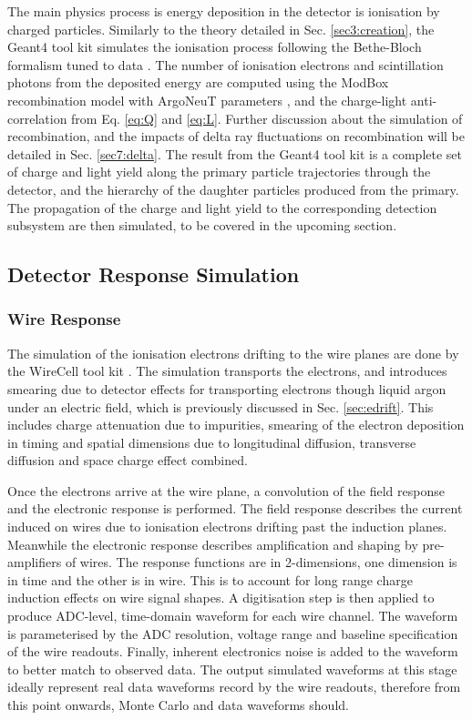 The main physics process is energy deposition in the detector is ionisation by charged particles.
Similarly to the theory detailed in Sec. \ref{sec3:creation}, the Geant4 tool kit simulates the ionisation process following the Bethe-Bloch formalism tuned to data \cite{geant4_ions}.
The number of ionisation electrons and scintillation photons from the deposited energy are computed using the ModBox recombination model with ArgoNeuT parameters \cite{argoneut_recomb}, and the charge-light anti-correlation from Eq. \ref{eq:Q} and \ref{eq:L}. 
Further discussion about the simulation of recombination, and the impacts of delta ray fluctuations on recombination will be detailed in Sec. \ref{sec7:delta}.
The result from the Geant4 tool kit is a complete set of charge and light yield along the primary particle trajectories through the detector, and the hierarchy of the daughter particles produced from the primary.
The propagation of the charge and light yield to the corresponding detection subsystem are then simulated, to be covered in the upcoming section.

\subsection{Detector Response Simulation}
\label{sec:gen_response}

\subsubsection{Wire Response}

The simulation of the ionisation electrons drifting to the wire planes are done by the WireCell tool kit \cite{wirecell}.
The simulation transports the electrons, and introduces smearing due to detector effects for transporting electrons though liquid argon under an electric field, which is previously discussed in Sec. \ref{sec:edrift}.
This includes charge attenuation due to impurities, smearing of the electron deposition in timing and spatial dimensions due to longitudinal diffusion, transverse diffusion and space charge effect combined.

Once the electrons arrive at the wire plane, a convolution of the field response and the electronic response is performed.
The field response describes the current induced on wires due to ionisation electrons drifting past the induction planes.
Meanwhile the electronic response describes amplification and shaping by pre-amplifiers of wires.
The response functions are in 2-dimensions, one dimension is in time and the other is in wire.
This is to account for long range charge induction effects on wire signal shapes.
A digitisation step is then applied to produce ADC-level, time-domain waveform for each wire channel.
The waveform is parameterised by the ADC resolution, voltage range and baseline specification of the wire readouts. 
Finally, inherent electronics noise is added to the waveform to better match to observed data.
The output simulated waveforms at this stage ideally represent real data waveforms record by the wire readouts, therefore from this point onwards, Monte Carlo and data waveforms should.

